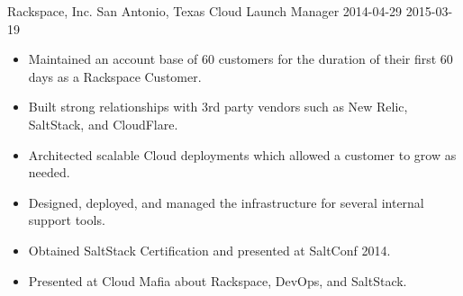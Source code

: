 \roleheader
    {Rackspace, Inc.}
    {San Antonio, Texas}
    {Cloud Launch Manager }
    {2014-04-29}
    {2015-03-19}

\begin{itemize} \itemsep 0pt
    \item Maintained an account base of 60 customers for the duration of their first 60 days as a Rackspace Customer.
    \item Built strong relationships with 3rd party vendors such as New Relic, SaltStack, and CloudFlare.
    \item Architected scalable Cloud deployments which allowed a customer to grow as needed.
    \item Designed, deployed, and managed the infrastructure for several internal support tools.
    \item Obtained SaltStack Certification and presented at SaltConf 2014.
    \item Presented at Cloud Mafia about Rackspace, DevOps, and SaltStack.
\end{itemize}